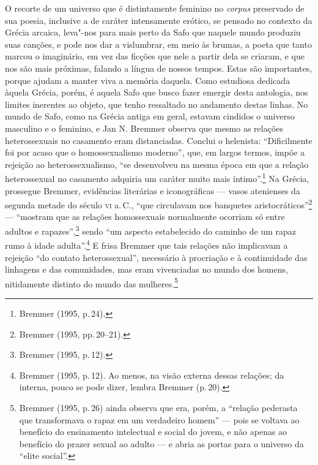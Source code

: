 O recorte de um universo que é distintamente feminino no \emph{corpus} preservado de sua poesia, inclusive
a de caráter intensamente erótico, se pensado no contexto da Grécia arcaica, leva"-nos para mais perto da Safo que naquele mundo produziu suas canções, e pode nos dar a vislumbrar, em meio às brumas, a poeta que tanto marcou o imaginário, em vez das ficções que nele a partir dela se criaram, e que nos são mais próximas, falando a língua de nossos tempos. Estas são importantes, porque ajudam a manter viva a memória daquela. Como estudiosa dedicada àquela Grécia, porém, é aquela Safo que busco fazer emergir desta antologia, nos limites inerentes ao objeto, que tenho ressaltado no andamento destas linhas. No mundo
de Safo, como na Grécia antiga em geral, estavam cindidos o universo masculino
e o feminino, e Jan N. Bremmer observa que mesmo as relações
heterossexuais no casamento eram distanciadas. Conclui o helenista:
“Dificilmente foi por acaso que o homossexualismo moderno”, que, em largos termos, impõe
a rejeição ao heterossexualismo, “se desenvolveu na mesma época em que a
relação heterossexual no casamento adquiria um caráter muito mais íntimo”.\footnote{ Bremmer (1995, p.\,24).} Na
Grécia, prossegue Bremmer, evidências literárias e iconográficas --- vasos
atenienses da segunda metade do século \textsc{vi} a.\,C., “que circulavam nos banquetes
aristocráticos”\footnote{ Bremmer (1995, pp.\,20--21).} --- “mostram que as relações homossexuais normalmente
ocorriam só entre adultos e rapazes”,\footnote{ Bremmer (1995, p.\,12).} sendo “um aspecto estabelecido do
caminho de um rapaz rumo à idade adulta”.\footnote{ Bremmer (1995, p.\,12). Ao menos, na visão
externa dessas relações; da interna, pouco se pode dizer, lembra Bremmer (p.\,20).} E frisa Bremmer que tais relações não implicavam a rejeição “do contato
heterossexual”, necessário à procriação e à continuidade das linhagens e das
comunidades, mas eram vivenciadas no mundo dos homens, nitidamente distinto do
mundo das mulheres.\footnote{ Bremmer (1995, p.\,26) ainda observa que era,
porém, a “relação pederasta que transformava o rapaz em um verdadeiro homem” ---
pois se voltava ao benefício do ensinamento intelectual e social do jovem, e
não apenas ao benefício do prazer sexual ao adulto --- e abria as portas para o
universo da “elite social”.}

